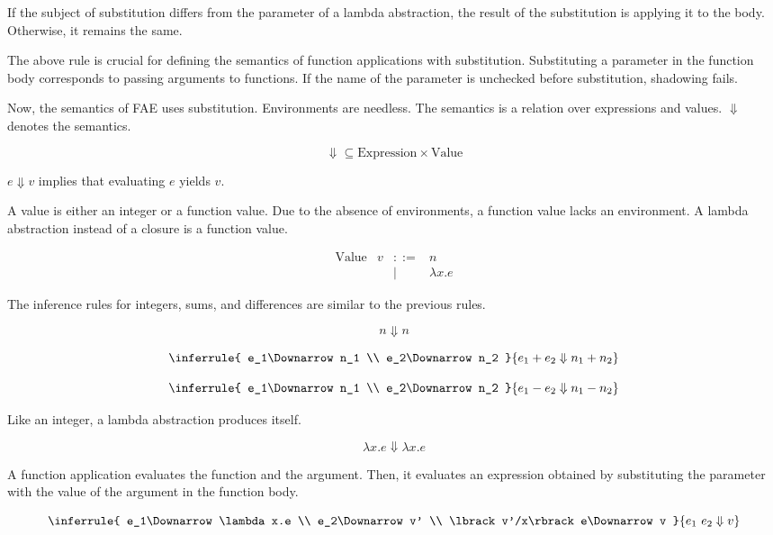 If the subject of substitution differs from the parameter of a lambda
abstraction, the result of the substitution is applying it to the body.
Otherwise, it remains the same.

The above rule is crucial for defining the semantics of function applications
with substitution. Substituting a parameter in the function body corresponds to
passing arguments to functions. If the name of the parameter is unchecked before
substitution, shadowing fails.

Now, the semantics of FAE uses substitution. Environments are needless. The
semantics is a relation over expressions and values. \(\Downarrow\) denotes the
semantics.

\[
\Downarrow \subseteq \text{Expression}\times\text{Value}
\]

\(e\Downarrow v\) implies that evaluating \(e\) yields \(v\).

A value is either an integer or a function value. Due to the absence of
environments, a function value lacks an environment. A lambda abstraction instead
of a closure is a function value.

\[
\begin{array}{lrcl}
\text{Value} & v & ::= & n \\
&& | & \lambda x.e
\end{array}
\]

The inference rules for integers, sums, and differences are similar to the
previous rules.

\[
n\Downarrow n
\]

\[
\inferrule
{
  e_1\Downarrow n_1 \\
  e_2\Downarrow n_2
}
{ e_1+e_2\Downarrow n_1+n_2 }
\]

\[
\inferrule
{
  e_1\Downarrow n_1 \\
  e_2\Downarrow n_2
}
{ e_1-e_2\Downarrow n_1-n_2 }
\]

Like an integer, a lambda abstraction produces itself.

\[
\lambda x.e\Downarrow\lambda x.e
\]

A function application evaluates the function and the argument. Then, it
evaluates an expression obtained by substituting the parameter with the value of
the argument in the function body.

\[
\inferrule{
  e_1\Downarrow \lambda x.e \\
  e_2\Downarrow v' \\
  \lbrack v'/x\rbrack e\Downarrow v
}
{ e_1\ e_2\Downarrow v }
\]

